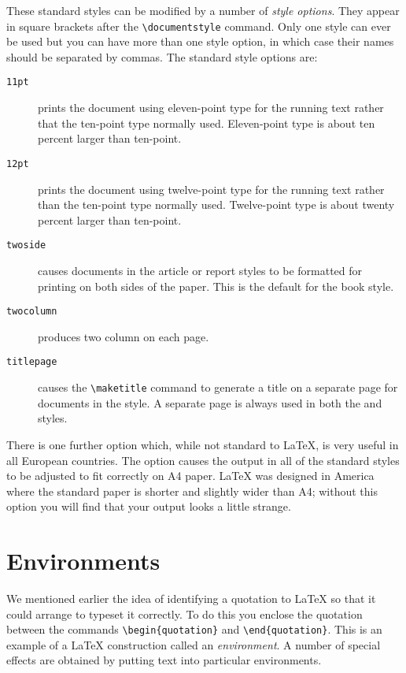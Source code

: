 These standard styles can be modified by a number of {\em style options\/}.
They appear in square brackets after the \verb|\documentstyle| command.
Only one style can ever be used but you can have more than one style option,
in which case their names should be separated by commas.  The standard style
options are:
\begin{description}

\item[{\tt 11pt}]  prints the document using eleven-point type for the running
 text
rather that the ten-point type normally used. Eleven-point type is about
ten percent larger than ten-point.

\item[{\tt 12pt}]  prints the document using twelve-point type for the running
 text
rather than the ten-point type normally used. Twelve-point type is about
twenty percent larger than ten-point.

\item[{\tt twoside}]  causes documents in the article or report styles to be
formatted for printing on both sides of the paper.  This is the default for the
book style.

\item[{\tt twocolumn}] produces two column on each page.

\item[{\tt titlepage}]  causes the \verb|\maketitle| command to generate a
title on a separate page for documents in the  style.
A separate page is always used in both the  and  styles.

\end{description}
There is one further option which, while not standard to \LaTeX{}, is very
useful in all European countries. The  option causes the output in all
of the standard styles to be adjusted to fit correctly on A4 paper.  \LaTeX{}
was designed in America where the standard paper is shorter and slightly wider
than A4; without this option you will find that your output looks a little
strange.

\section{Environments}

We mentioned earlier the idea of identifying a quotation to \LaTeX{} so that
it could arrange to typeset it correctly. To do this you enclose the
quotation between the commands \verb|\begin{quotation}| and
\verb|\end{quotation}|.
This is an example of a \LaTeX{} construction called an {\em environment\/}.
A number of
special effects are obtained by putting text into particular environments.

